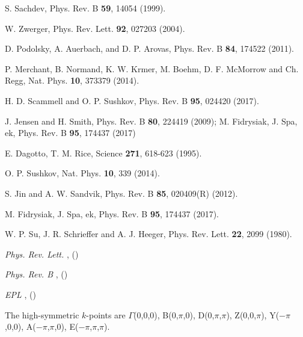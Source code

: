 \documentclass[aps,prl,showpacs,twocolumn,groupedaddress]{revtex4-1}
\begin{document}
\begin{thebibliography}{1}
      S. Sachdev, Phys. Rev. B {\bf 59}, 14054 (1999).

      W. Zwerger, Phys. Rev. Lett. {\bf 92}, 027203 (2004).

      D. Podolsky, A. Auerbach, and D. P. Arovas, Phys. Rev. B {\bf 84}, 174522 (2011).

      P. Merchant, B. Normand, K. W. Krmer, M. Boehm, D. F. McMorrow and Ch. Regg, Nat. Phys. {\bf 10}, 373379 (2014).
	

	 H. D. Scammell and O. P. Sushkov, Phys. Rev. B {\bf 95}, 024420 (2017).

      
       J. Jensen and H. Smith, Phys. Rev. B {\bf 80}, 224419 (2009); M. Fidrysiak, J. Spa, ek, Phys. Rev. B {\bf 95}, 174437 (2017)

       E. Dagotto, T. M. Rice, Science  {\bf 271}, 618-623 (1995).

      O. P. Sushkov, Nat. Phys. {\bf 10}, 339 (2014).


	 S. Jin and A. W. Sandvik, Phys. Rev. B {\bf 85}, 020409(R) (2012).

	
         M. Fidrysiak, J. Spa, ek, Phys. Rev. B {\bf 95}, 174437 (2017).

	W. P. Su, J. R. Schrieffer and  A. J. Heeger, Phys. Rev. Lett. {\bf 22}, 2099 (1980).
	
	\newblock \emph{ {Phys. Rev. Lett.}}
	\textbf{},  ()

	\newblock \emph{ {Phys. Rev. B}}
	\textbf{},  ()

	\newblock \emph{ {EPL}}
	\textbf{},  ()
	

     The high-symmetric $k$-points are $\Gamma$(0,0,0), B(0,$\pi$,0), D(0,$\pi$,$\pi$), Z(0,0,$\pi$), Y($-\pi$,0,0),$ $ A($-\pi$,$\pi$,0), E($-\pi$,$\pi$,$\pi$).


\end{thebibliography}
\end{document}
